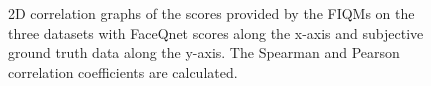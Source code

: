 \begin{figure}[h]
\centering
    \caption{2D correlation graphs of the scores provided by the FIQMs on the three datasets with FaceQnet scores along the x-axis and subjective ground truth data along the y-axis. The Spearman and Pearson correlation coefficients are calculated.}
    \label{fig:corrFACEQNETsvsSub}
\end{figure}
